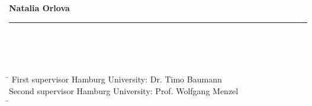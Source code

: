 \begin{titlepage}
	\noindent \textbf{Natalia Orlova} \\
	\noindent \rule{\textwidth}{0.4mm} 
	 \\
	 \\
	 \\
	\begin{tabbing}
	\hspace{20em} \=  \kill
	First supervisor Hamburg University: \> Dr. Timo Baumann \\
	Second supervisor Hamburg University: \> Prof. Wolfgang Menzel \\
		
	\hspace{20em} \=  \kill
	
			
	\end{tabbing}
	

\end{titlepage}

%
%